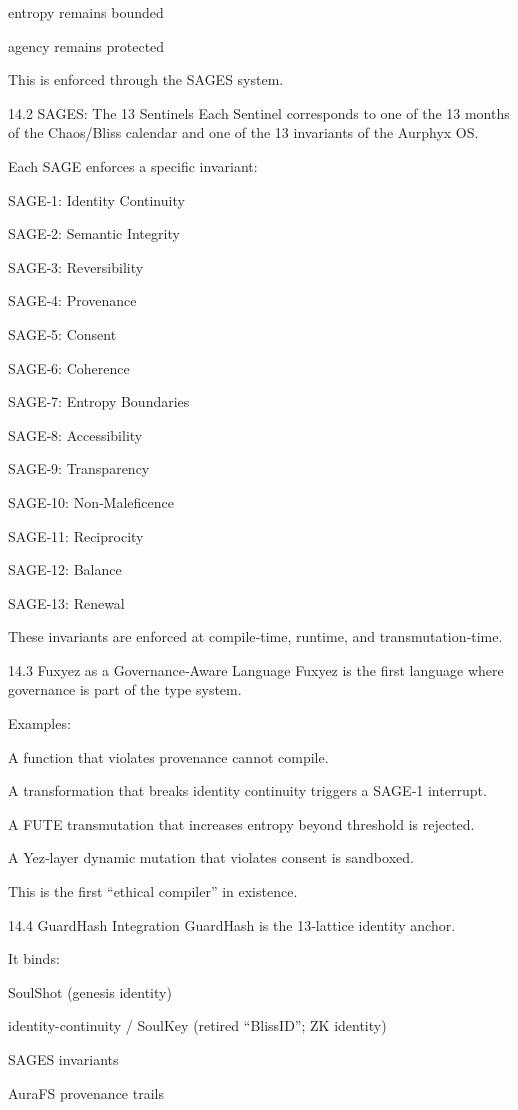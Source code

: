 \documentclass[12pt, a4paper]{book}
\begin{document}
entropy remains bounded

agency remains protected

This is enforced through the SAGES system.

14.2 SAGES: The 13 Sentinels
Each Sentinel corresponds to one of the 13 months of the Chaos/Bliss calendar and one of the 13 invariants of the Aurphyx OS.

Each SAGE enforces a specific invariant:

SAGE‑1: Identity Continuity

SAGE‑2: Semantic Integrity

SAGE‑3: Reversibility

SAGE‑4: Provenance

SAGE‑5: Consent

SAGE‑6: Coherence

SAGE‑7: Entropy Boundaries

SAGE‑8: Accessibility

SAGE‑9: Transparency

SAGE‑10: Non‑Maleficence

SAGE‑11: Reciprocity

SAGE‑12: Balance

SAGE‑13: Renewal

These invariants are enforced at compile‑time, runtime, and transmutation‑time.

14.3 Fuxyez as a Governance‑Aware Language
Fuxyez is the first language where governance is part of the type system.

Examples:

A function that violates provenance cannot compile.

A transformation that breaks identity continuity triggers a SAGE‑1 interrupt.

A FUTE transmutation that increases entropy beyond threshold is rejected.

A Yez‑layer dynamic mutation that violates consent is sandboxed.

This is the first “ethical compiler” in existence.

14.4 GuardHash Integration
GuardHash is the 13‑lattice identity anchor.

It binds:

SoulShot (genesis identity)

identity-continuity / SoulKey (retired ``BlissID''; ZK identity)

SAGES invariants

AuraFS provenance trails
\end{document}
